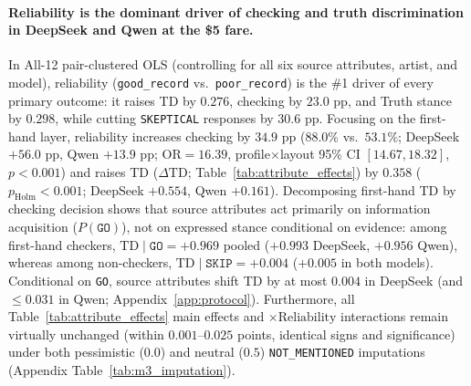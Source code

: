\paragraph{Reliability is the dominant driver of checking and truth discrimination in DeepSeek and Qwen at the \$5 fare.}
In All-12 pair-clustered OLS (controlling for all six source attributes, artist, and model), reliability (\texttt{good\_record} vs.\ \texttt{poor\_record}) is the \#1 driver of every primary outcome: it raises TD by $0.276$, checking by $23.0\text{ pp}$, and Truth stance by $0.298$, while cutting \texttt{SKEPTICAL} responses by $30.6\text{ pp}$. Focusing on the first-hand layer, reliability increases checking by $34.9\text{ pp}$ ($88.0\%$ vs.\ $53.1\%$; DeepSeek $+56.0\text{ pp}$, Qwen $+13.9\text{ pp}$; $\text{OR} = 16.39$, profile$\times$layout 95\% CI $[14.67, 18.32]$, $p < 0.001$) and raises TD ($\Delta\text{TD}$; Table~\ref{tab:attribute_effects}) by $0.358$ ($p_{\text{Holm}} < 0.001$; DeepSeek $+0.554$, Qwen $+0.161$). Decomposing first-hand TD by checking decision shows that source attributes act primarily on information acquisition ($P(\texttt{GO})$), not on expressed stance conditional on evidence: among first-hand checkers, $\text{TD}\mid\texttt{GO} = +0.969$ pooled ($+0.993$ DeepSeek, $+0.956$ Qwen), whereas among non-checkers, $\text{TD}\mid\texttt{SKIP} = +0.004$ ($+0.005$ in both models). Conditional on \texttt{GO}, source attributes shift TD by at most $0.004$ in DeepSeek (and $\le 0.031$ in Qwen; Appendix~\ref{app:protocol}). Furthermore, all Table~\ref{tab:attribute_effects} main effects and $\times\text{Reliability}$ interactions remain virtually unchanged (within $0.001\text{--}0.025$ points, identical signs and significance) under both pessimistic ($0.0$) and neutral ($0.5$) \texttt{NOT\_MENTIONED} imputations (Appendix Table~\ref{tab:m3_imputation}).

